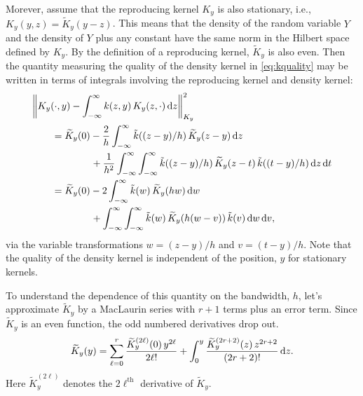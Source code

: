 \documentclass[letterpaper]{amsart}
\newcommand{\KY}{K_y}
\newcommand{\tKY}{\widetilde{K}_y}
\newcommand{\tk}{\tilde{k}}
\begin{document}
Morever, assume that the reproducing kernel $\KY$ is also stationary, i.e., $\KY(y,z) = \tKY(y-z)$. This means that the density of the random variable $Y$ and the density of $Y$ plus any constant have the same norm in the Hilbert space defined by $\KY$.  By the definition of a reproducing kernel, $\tKY$ is also even. Then the quantity measuring the quality of the density kernel in \eqref{eq:kquality} may be written in terms of integrals involving the reproducing kernel and density kernel:
\begin{align*}
	\MoveEqLeft{\norm[\KY]{\KY(\cdot,y) - \int_{-\infty}^{\infty} k(z,y) \, \KY(z,\cdot) \, \dif z}^2} \\
	&=  \tKY(0) -  \frac 2h \int_{-\infty}^{\infty} \tk((z-y)/h) \, \tKY(z-y) \, \dif z \\
	& \qquad \qquad + \frac 1{h^2} \int_{-\infty}^{\infty} \int_{-\infty}^{\infty}  \tk((z-y)/h)  \, \tKY(z-t) \, \tk((t-y)/h) \, \dif z \, \dif t \\
	&=   \tKY(0) - 2 \int_{-\infty}^{\infty} \tk(w) \, \tKY(hw) \, \dif w \\
	& \qquad \qquad + \int_{-\infty}^{\infty} \int_{-\infty}^{\infty}  \tk(w) \, \tKY(h(w-v)) \, \tk(v)\, \dif w \, \dif v,
\end{align*}
via the variable transformations $w = (z-y)/h$ and $v = (t-y)/h$. Note that the quality of the density kernel is independent of the position, $y$ for stationary kernels.

To understand the dependence of this quantity on the bandwidth, $h$, let's approximate $\tKY$ by a MacLaurin series with $r+1$ terms plus an error term.  Since $\tKY$ is an even function, the odd numbered derivatives drop out.
\begin{equation*}
	\tKY(y)  = \sum_{\ell = 0}^{r} \frac{\tKY^{(2\ell)}(0) \, y^{2\ell}}{2\ell!} + \int_0^y \frac{\tKY^{(2r+2)}(z) \,  z^{2r+2}}{(2r+2)!} \, \dif z.
\end{equation*}
Here $\tKY^{(2\ell)}$ denotes the $2\ell^{\text{th}}$ derivative of $\tKY$.
\end{document}
